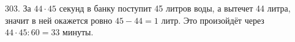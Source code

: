 303. За $44\cdot45$ секунд в банку поступит 45 литров воды, а вытечет 44 литра, значит в ней окажется ровно $45-44=1$ литр. Это произойдёт через $44\cdot45:60=33$ минуты.\\
